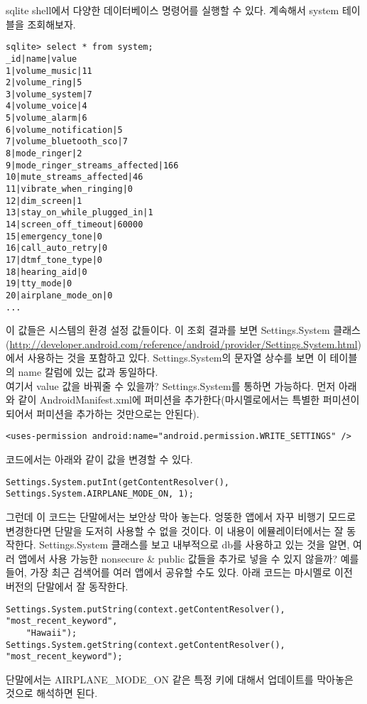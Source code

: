 sqlite shell에서 다양한 데이터베이스 명령어를 실행할 수 있다. 계속해서 system 테이블을 조회해보자.
\begin{lstlisting}[frame=single] 
sqlite> select * from system;
_id|name|value
1|volume_music|11
2|volume_ring|5
3|volume_system|7
4|volume_voice|4
5|volume_alarm|6
6|volume_notification|5
7|volume_bluetooth_sco|7
8|mode_ringer|2
9|mode_ringer_streams_affected|166
10|mute_streams_affected|46
11|vibrate_when_ringing|0
12|dim_screen|1
13|stay_on_while_plugged_in|1
14|screen_off_timeout|60000
15|emergency_tone|0
16|call_auto_retry|0
17|dtmf_tone_type|0
18|hearing_aid|0
19|tty_mode|0
20|airplane_mode_on|0
...
\end{lstlisting}
이 값들은 시스템의 환경 설정 값들이다. 이 조회 결과를 보면 Settings.System 클래스(\url{http://developer.android.com/reference/android/provider/Settings.System.html})에서 사용하는 것을 포함하고 있다. 
Settings.System의 문자열 상수를 보면 이 테이블의 name 칼럼에 있는 값과 동일하다.\\

여기서 value 값을 바꿔줄 수 있을까? Settings.System를 통하면 가능하다.
먼저 아래와 같이 AndroidManifest.xml에 퍼미션을 추가한다(마시멜로에서는 특별한 퍼미션이 되어서 퍼미션을 추가하는 것만으로는 안된다).
\begin{lstlisting}[frame=single]
<uses-permission android:name="android.permission.WRITE_SETTINGS" />
\end{lstlisting}

코드에서는 아래와 같이 값을 변경할 수 있다.
\begin{lstlisting}[frame=single]
Settings.System.putInt(getContentResolver(), Settings.System.AIRPLANE_MODE_ON, 1);
\end{lstlisting}

그런데 이 코드는 단말에서는 보안상 막아 놓는다. 엉뚱한 앱에서 자꾸 비행기 모드로 변경한다면 단말을 도저히 사용할 수 없을 것이다.
이 내용이 에뮬레이터에서는 잘 동작한다.
Settings.System 클래스를 보고 내부적으로 db를 사용하고 있는 것을 알면, 여러 앱에서 사용 가능한 nonsecure \& public 값들을 추가로 넣을 수 있지 않을까? 예를 들어, 가장 최근 검색어를 여러 앱에서 공유할 수도 있다.
아래 코드는 마시멜로 이전 버전의 단말에서 잘 동작한다.
\begin{lstlisting}[frame=single]
Settings.System.putString(context.getContentResolver(), "most_recent_keyword",
	"Hawaii");
Settings.System.getString(context.getContentResolver(), "most_recent_keyword");
\end{lstlisting}

단말에서는 AIRPLANE\_MODE\_ON 같은 특정 키에 대해서 업데이트를 막아놓은 것으로 해석하면 된다.\\


